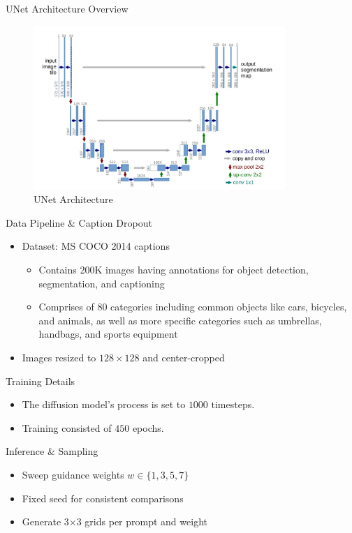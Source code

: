 \documentclass[11pt]{beamer}
\begin{document}
\begin{frame}{UNet Architecture Overview}
  \begin{figure}[ht]
  \centering
  \includegraphics[width=0.85\textwidth]{figures/unet.png}
  \caption{UNet Architecture}
  \end{figure}
\end{frame}


\begin{frame}{Data Pipeline \& Caption Dropout}
  \begin{itemize}
    \item Dataset: MS COCO 2014 captions
    \begin{itemize}
      \item Contains 200K images having annotations for object detection, segmentation, and captioning
      \item Comprises of 80 categories including common objects like cars, bicycles, and animals, as well as more specific categories such as umbrellas, handbags, and sports equipment
    \end{itemize}
    \item Images resized to $128\times128$ and center-cropped
  \end{itemize}
\end{frame}

\begin{frame}{Training Details}
  \begin{itemize}
    \item The diffusion model's process is set to $1000$ timesteps.
    \item Training consisted of $450$ epochs.
  \end{itemize}
\end{frame}

\begin{frame}{Inference \& Sampling}
  \begin{itemize}
    \item Sweep guidance weights $w \in \{1,3,5,7\}$
    \item Fixed seed for consistent comparisons
    \item Generate 3×3 grids per prompt and weight
  \end{itemize}
\end{frame}
\end{document}

